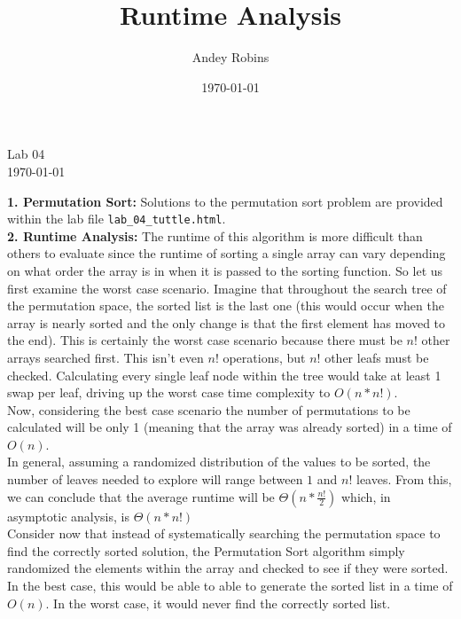 \documentclass[12pt]{article}
\author{Andey Robins}
\title{Runtime Analysis}
\date{\today{}}
\begin{document}
\begin{center}
    {\Large Lab 04} \\ \today{}
\end{center}
\vspace{5pt}
\textbf{1. Permutation Sort:} Solutions to the permutation sort problem are provided within the lab file \texttt{lab\_04\_tuttle.html}. \\

\vspace{5pt}\noindent
\textbf{2. Runtime Analysis:} The runtime of this algorithm is more difficult than others to evaluate since the runtime of sorting a single array can vary depending on what order the array is in when it is passed to the sorting function. So let us first examine the worst case scenario. Imagine that throughout the search tree of the permutation space, the sorted list is the last one (this would occur when the array is nearly sorted and the only change is that the first element has moved to the end). This is certainly the worst case scenario because there must be $n!$ other arrays searched first. This isn't even $n!$ operations, but $n!$ other leafs must be checked. Calculating every single leaf node within the tree would take at least 1 swap per leaf, driving up the worst case time complexity to $O(n * n!)$. \\

Now, considering the best case scenario the number of permutations to be calculated will be only 1 (meaning that the array was already sorted) in a time of $O(n)$. \\

In general, assuming a randomized distribution of the values to be sorted, the number of leaves needed to explore will range between $1$ and $n!$ leaves. From this, we can conclude that the average runtime will be $\Theta{(n * \frac{n!}{2})}$ which, in asymptotic analysis, is $\Theta{(n * n!)}$ \\

Consider now that instead of systematically searching the permutation space to find the correctly sorted solution, the Permutation Sort algorithm simply randomized the elements within the array and checked to see if they were sorted. In the best case, this would be able to able to generate the sorted list in a time of $O(n)$. In the worst case, it would never find the correctly sorted list.
\end{document}
